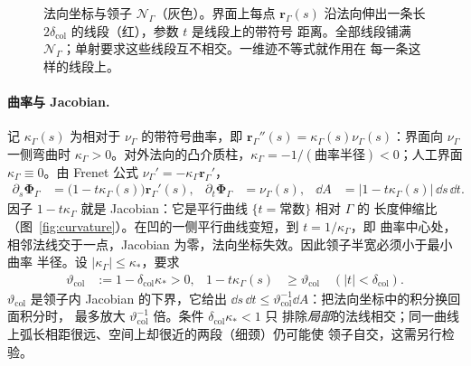 \begin{figure}[htbp]
  \caption{法向坐标与领子 $\mathcal N_\Gamma$（灰色）。界面上每点 $\boldsymbol r_\Gamma(s)$
    沿法向伸出一条长 $2\delta_{\mathrm{col}}$ 的线段（红），参数 $t$ 是线段上的带符号
    距离。全部线段铺满 $\mathcal N_\Gamma$；单射要求这些线段互不相交。一维迹不等式就作用在
    每一条这样的线段上。}
  \label{fig:collar}
\end{figure}

\paragraph{曲率与 Jacobian.}
记 $\kappa_\Gamma(s)$ 为相对于 $\nu_\Gamma$ 的带符号曲率，即
$\boldsymbol r_\Gamma''(s)=\kappa_\Gamma(s)\nu_\Gamma(s)$：界面向 $\nu_\Gamma$ 一侧弯曲时
$\kappa_\Gamma>0$。对外法向的凸介质柱，$\kappa_\Gamma=-1/(\text{曲率半径})<0$；人工界面
$\kappa_\Gamma\equiv0$。由 Frenet 公式 $\nu_\Gamma'=-\kappa_\Gamma\boldsymbol r_\Gamma'$，
\begin{align}
  \partial_s\boldsymbol\Phi_\Gamma
  &=\bigl(1-t\kappa_\Gamma(s)\bigr)\boldsymbol r_\Gamma'(s),
  &\partial_t\boldsymbol\Phi_\Gamma&=\nu_\Gamma(s),
  &\dd A&=\bigl|1-t\kappa_\Gamma(s)\bigr|\,\dd s\,\dd t.
  \label{eq:collar-jacobian}
\end{align}
因子 $1-t\kappa_\Gamma$ 就是 Jacobian：它是平行曲线 $\{t=\text{常数}\}$ 相对 $\Gamma$ 的
长度伸缩比（图~\ref{fig:curvature}）。在凹的一侧平行曲线变短，到 $t=1/\kappa_\Gamma$，即
曲率中心处，相邻法线交于一点，Jacobian 为零，法向坐标失效。因此领子半宽必须小于最小曲率
半径。设 $\lvert\kappa_\Gamma\rvert\leq\kappa_*$，要求
\begin{align}
  \vartheta_{\mathrm{col}}&:=1-\delta_{\mathrm{col}}\kappa_*>0,
  &1-t\kappa_\Gamma(s)&\geq\vartheta_{\mathrm{col}}
  \quad(|t|<\delta_{\mathrm{col}}).
  \label{eq:collar-jacobian-lower-bound}
\end{align}
$\vartheta_{\mathrm{col}}$ 是领子内 Jacobian 的下界，它给出
$\dd s\,\dd t\leq\vartheta_{\mathrm{col}}^{-1}\dd A$：把法向坐标中的积分换回面积分时，
最多放大 $\vartheta_{\mathrm{col}}^{-1}$ 倍。条件 $\delta_{\mathrm{col}}\kappa_*<1$ 只
排除\emph{局部}的法线相交；同一曲线上弧长相距很远、空间上却很近的两段（细颈）仍可能使
领子自交，这需另行检验。

